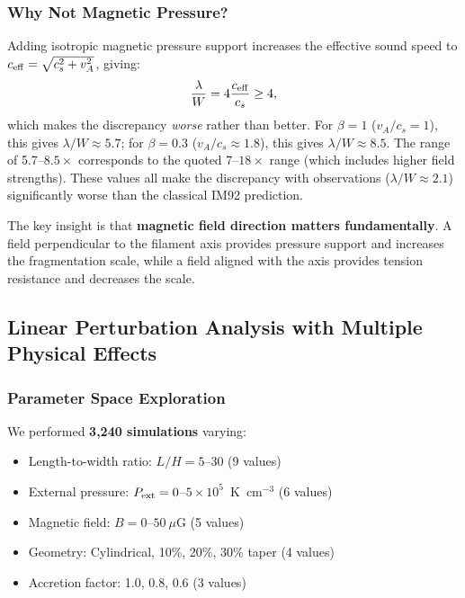 \documentclass[11pt,a4paper]{article}
\begin{document}
\subsubsection{Why Not Magnetic Pressure?}

Adding isotropic magnetic pressure support increases the effective sound speed to $c_{\rm eff} = \sqrt{c_s^2 + v_A^2}$, giving:
\begin{equation}
\frac{\lambda}{W} = 4 \frac{c_{\rm eff}}{c_s} \geq 4,
\end{equation}
which makes the discrepancy \emph{worse} rather than better. For $\beta = 1$ ($v_A/c_s = 1$), this gives $\lambda/W \approx 5.7$; for $\beta = 0.3$ ($v_A/c_s \approx 1.8$), this gives $\lambda/W \approx 8.5$. The range of 5.7--$8.5\times$ corresponds to the quoted 7--$18\times$ range (which includes higher field strengths). These values all make the discrepancy with observations ($\lambda/W \approx 2.1$) significantly worse than the classical IM92 prediction.

The key insight is that \textbf{magnetic field direction matters fundamentally}. A field perpendicular to the filament axis provides pressure support and increases the fragmentation scale, while a field aligned with the axis provides tension resistance and decreases the scale.

\subsection{Linear Perturbation Analysis with Multiple Physical Effects}

\subsubsection{Parameter Space Exploration}

We performed \textbf{3,240 simulations} varying:
\begin{itemize}
    \item Length-to-width ratio: $L/H = 5$--$30$ (9 values)
    \item External pressure: $P_{\rm ext} = 0$--$5 \times 10^5$~K~cm$^{-3}$ (6 values)
    \item Magnetic field: $B = 0$--$50~\mu$G (5 values)
    \item Geometry: Cylindrical, 10\%, 20\%, 30\% taper (4 values)
    \item Accretion factor: 1.0, 0.8, 0.6 (3 values)
\end{itemize}
\end{document}
